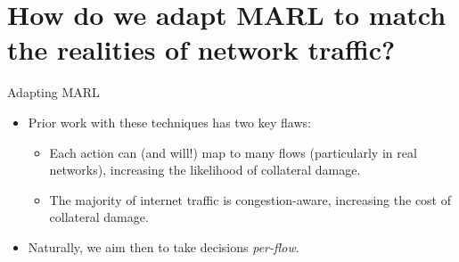 \documentclass[aspectratio=169,xcolor={dvipsnames}
,hide notes
]{beamer}
\begin{document}
%	
%	
%	
%	
%

\section{How do we adapt MARL to match the realities of network traffic?}

\begin{frame}{Adapting MARL}
\begin{itemize}
	\item Prior work with these techniques has two key flaws:
	\begin{itemize}
		\item Each action can (and will!) map to many flows (particularly in real networks), increasing the \alert{likelihood} of collateral damage.
		\item The majority of internet traffic is congestion-aware, increasing the \alert{cost} of collateral damage.
	\end{itemize}
	\item Naturally, we aim then to take decisions \emph{per-flow}.
\end{itemize}
\end{frame}
\end{document}
